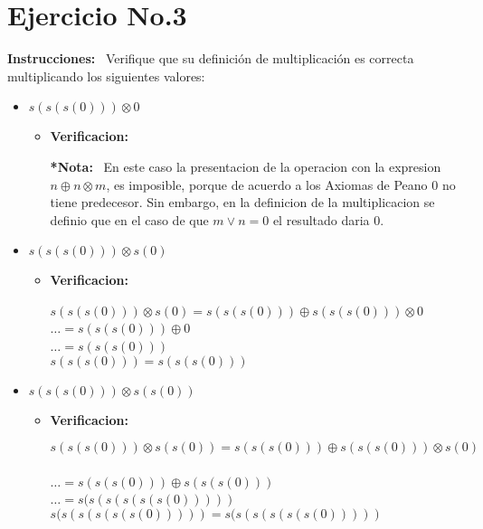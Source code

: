 \documentclass[10pt,a4paper]{article}
\begin{document}
\section*{Ejercicio No.3}
\begin{flushleft}
\textbf{Instrucciones: } \ Verifique que su definici\'on de multiplicaci\'on es correcta multiplicando los siguientes valores:
\end{flushleft}
\begin{itemize}
\item{$s(s(s(0)))\otimes 0$}
\begin{itemize}
\item \textbf{Verificacion: }
\begin{center}
\textbf{*Nota: } \ En este caso la presentacion de la operacion con la expresion $n\oplus n\otimes m$, es imposible, porque de acuerdo a los Axiomas de Peano $ 0 $ no tiene predecesor. Sin embargo, en la definicion de la multiplicacion se definio que en el caso de que $ m \vee n = 0$ el resultado daria $ 0 $. 
\end{center}
\end{itemize}

\item{$s(s(s(0)))\otimes s(0)$}
\begin{itemize}
\item \textbf{Verificacion: }
\begin{center}
$s(s(s(0)))\otimes s(0) = s(s(s(0)))\oplus s(s(s(0)))\otimes 0$
\
\\ $\dots = s(s(s(0)))\oplus 0$
\
\\ $\dots = s(s(s(0)))$
\
\\$s(s(s(0))) = s(s(s(0)))$
\end{center}
\end{itemize}
\item{$s(s(s(0)))\otimes s(s(0))$}
\begin{itemize}
\item \textbf{Verificacion: }
\begin{center}
$ s(s(s(0)))\otimes s(s(0)) = s(s(s(0)))\oplus s(s(s(0)))\otimes s(0)$
\
\\$\dots = s(s(s(0)))\oplus s(s(s(0)))$
\
\\ $\dots = s(s(s(s(s(s(0))))) $
\
\\ $s(s(s(s(s(s(0)))))  = s(s(s(s(s(s(0))))) $
\end{center}
\end{itemize}
\end{itemize}
\end{document}
